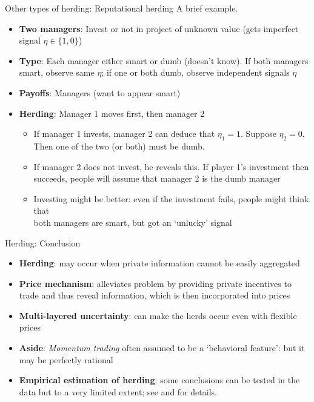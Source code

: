 \documentclass[english,10pt
,aspectratio=169
]{beamer}
\begin{document}
\begin{frame}{Other types of herding: Reputational herding}
	A brief example.
	\begin{itemize}
		\item \textbf{Two  managers}: Invest or not in project of unknown value (gets imperfect signal $\eta \in \{1,0\}$)
		\item \textbf{Type}: Each manager either smart or dumb (doesn't know). If both managers smart, observe same $\eta$; if one or both dumb, observe independent signals $\eta$ %
		\item \textbf{Payoffs}:  Managers  (want to appear smart)
		\item \textbf{Herding}: Manager 1 moves first, then manager 2 
		\begin{itemize}
			\item If manager 1 invests, manager 2 can deduce that $\eta_1=1$. Suppose $\eta_2=0$. 
			\\ Then one of the two (or both) must be dumb. 
			\item If manager 2 does not invest, he reveals this. If player 1's investment then 
			\\succeeds, people will assume that manager 2 is the dumb manager
			\item Investing might be better: even if the investment fails, people might think that 
			\\both managers are smart, but got an `unlucky' signal
		\end{itemize}
	\end{itemize}
\end{frame}


\begin{frame}{Herding: Conclusion}
	\begin{itemize}
		\item \textbf{Herding}: may occur when private information cannot be easily aggregated
		\item \textbf{Price mechanism}: alleviates problem by providing private incentives to trade and thus reveal information, which is then incorporated into prices
		\item \textbf{Multi-layered uncertainty}: can make the herds occur even with flexible prices
		\item \textbf{Aside}: \emph{Momentum trading} often assumed to be a `behavioral feature': but it may be perfectly rational
		\item \textbf{Empirical estimation of herding}: some conclusions can be tested in the data but to a very limited extent; see \cite{bikhchandani_herd_2000} and \cite{bikhchandani_information_2021} for details.
	\end{itemize}
\end{frame}
\end{document}
